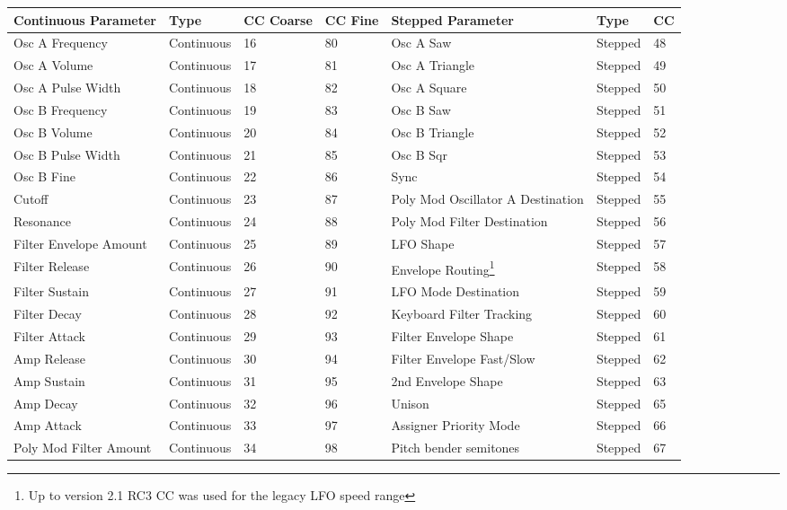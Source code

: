 \begin{longtable}[l]{ p{5cm}|p{2cm}|p{1.5cm}|p{1.5cm}|p{5cm}|p{2cm}|p{1cm}} 
\textbf{Continuous Parameter} & \textbf{Type} & \textbf{ CC Coarse} & \textbf{CC Fine} & \textbf{Stepped Parameter} & \textbf{Type} & \textbf{CC} \\ \hline
Osc A Frequency & Continuous & 16 & 80 & Osc A Saw & Stepped & 48 \\ \hline
Osc A Volume & Continuous & 17 & 81 & Osc A Triangle & Stepped & 49 \\ \hline
Osc A Pulse Width & Continuous & 18 & 82 & Osc A Square & Stepped & 50 \\ \hline
Osc B Frequency & Continuous & 19 & 83 & Osc B Saw & Stepped & 51 \\ \hline
Osc B Volume & Continuous & 20 & 84 & Osc B Triangle & Stepped & 52 \\ \hline
Osc B Pulse Width & Continuous & 21 & 85 & Osc B Sqr & Stepped & 53 \\ \hline
Osc B Fine & Continuous & 22 & 86 & Sync & Stepped & 54 \\ \hline
Cutoff & Continuous & 23 & 87 & Poly Mod Oscillator A Destination & Stepped & 55 \\ \hline
Resonance & Continuous & 24 & 88 & Poly Mod Filter Destination & Stepped & 56 \\ \hline
Filter Envelope Amount & Continuous & 25 & 89 & LFO Shape & Stepped & 57 \\ \hline
Filter Release & Continuous & 26 & 90 & Envelope Routing\footnote{Up to version 2.1 RC3 CC was used for the legacy LFO speed range} & Stepped & 58 \\ \hline
Filter Sustain & Continuous & 27 & 91 & LFO Mode Destination & Stepped & 59 \\ \hline
Filter Decay & Continuous & 28 & 92 & Keyboard Filter Tracking & Stepped & 60 \\ \hline
Filter Attack & Continuous & 29 & 93 & Filter Envelope Shape & Stepped & 61 \\ \hline
Amp Release & Continuous & 30 & 94 & Filter Envelope Fast/Slow & Stepped & 62 \\ \hline
Amp Sustain & Continuous & 31 & 95 & 2nd Envelope Shape & Stepped & 63 \\ \hline
Amp Decay & Continuous & 32 & 96 & Unison & Stepped & 65 \\ \hline
Amp Attack & Continuous & 33 & 97 & Assigner Priority Mode & Stepped & 66 \\ \hline
Poly Mod Filter Amount & Continuous & 34 & 98 & Pitch bender semitones & Stepped & 67 \\ \hline

\end{longtable}
